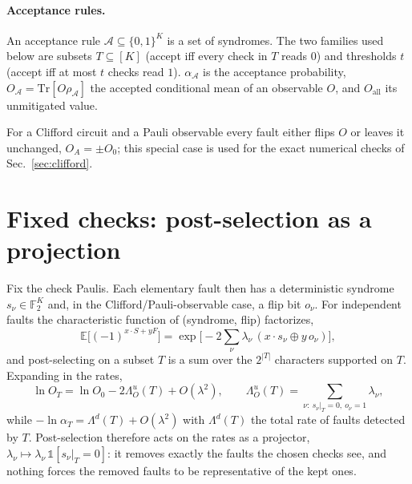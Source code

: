 \documentclass[11pt,a4paper]{article}
\theoremstyle{remark}
\newcommand{\Tr}{\mathrm{Tr}}
\newcommand{\all}{\mathrm{all}}
\newcommand{\acc}{\mathcal{A}}
\begin{document}
\paragraph{Acceptance rules.} An acceptance rule $\acc\subseteq\{0,1\}^K$ is a set of syndromes. The two families used below are subsets $T\subseteq[K]$ (accept iff every check in $T$ reads $0$) and thresholds $t$ (accept iff at most $t$ checks read $1$). $\alpha_\acc$ is the acceptance probability, $O_\acc=\Tr[O\rho_\acc]$ the accepted conditional mean of an observable $O$, and $O_\all$ its unmitigated value.

For a Clifford circuit and a Pauli observable every fault either flips $O$ or leaves it unchanged, $O_A=\pm O_0$; this special case is used for the exact numerical checks of Sec.~\ref{sec:clifford}.

\section{Fixed checks: post-selection as a projection}
\label{sec:fixed}

Fix the check Paulis. Each elementary fault then has a deterministic syndrome $s_\nu\in\mathbb F_2^K$ and, in the Clifford/Pauli-observable case, a flip bit $o_\nu$. For independent faults the characteristic function of (syndrome, flip) factorizes,
\begin{equation}
\mathbb E\big[(-1)^{x\cdot S+yF}\big]=\exp\Big[-2\sum_\nu\lambda_\nu\,(x\cdot s_\nu\oplus y\,o_\nu)\Big],
\end{equation}
and post-selecting on a subset $T$ is a sum over the $2^{|T|}$ characters supported on $T$. Expanding in the rates,
\begin{equation}
\ln O_T=\ln O_0-2\Lambda_O^u(T)+O(\lambda^2),\qquad
\Lambda_O^u(T)=\sum_{\nu:\ s_\nu|_T=0,\ o_\nu=1}\lambda_\nu,
\label{eq:fixed-first-order}
\end{equation}
while $-\ln\alpha_T=\Lambda^d(T)+O(\lambda^2)$ with $\Lambda^d(T)$ the total rate of faults detected by $T$. Post-selection therefore acts on the rates as a projector, $\lambda_\nu\mapsto\lambda_\nu\,\mathbb 1[s_\nu|_T=0]$: it removes exactly the faults the chosen checks see, and nothing forces the removed faults to be representative of the kept ones.
\end{document}
